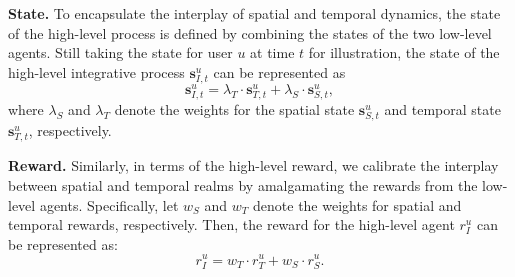 \documentclass[letterpaper]{article} %
\begin{document}
\noindent\textbf{State.} 
To encapsulate the interplay of spatial and temporal dynamics, the state of the high-level process is defined by combining the states of the two low-level agents.
Still taking the state for user $u$ at time $t$ for illustration, the state of the high-level integrative process $\mathbf{s}_{I,t}^{u}$ can be represented as 
\begin{equation}
    \mathbf{s}_{I,t}^{u} = \lambda_{T} \cdot \mathbf{s}_{T,t}^{u} + \lambda_{S} \cdot \mathbf{s}_{S,t}^{u},
\label{equ: high level state}
\end{equation}
where $\lambda_S$ and $\lambda_T$ denote the weights for the spatial state $\mathbf{s}_{S,t}^{u}$ and temporal state $\mathbf{s}_{T,t}^{u}$, respectively.

\noindent\textbf{Reward.} 
Similarly, in terms of the high-level reward, we calibrate the interplay between spatial and temporal realms by amalgamating the rewards from the low-level agents. 
Specifically, let $w_{S}$ and $w_{T}$ denote the weights for spatial and temporal rewards, respectively. 
Then, the reward for the high-level agent $r_{I}^{u}$ can be represented as:
\begin{equation}
    r^{u}_I = w_{T} \cdot r_{T}^{u} + w_{S} \cdot r_{S}^{u}.
\label{equ: high-level reward}
\end{equation}
\end{document}
